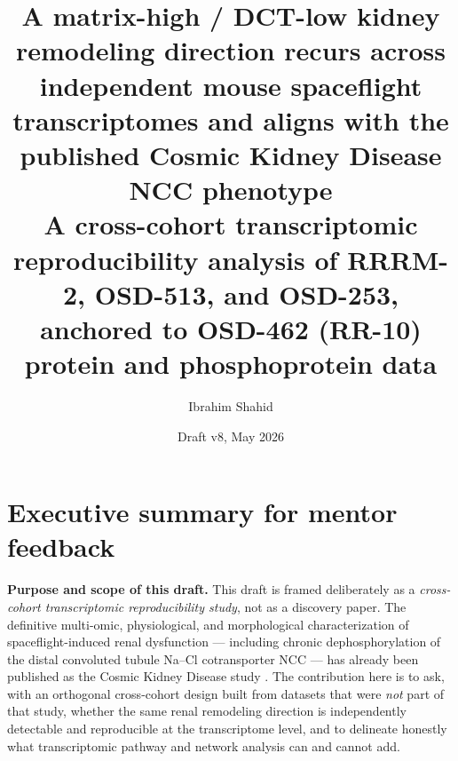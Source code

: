 \documentclass[11pt]{article}
\title{\textbf{A matrix-high / DCT-low kidney remodeling direction recurs across independent mouse spaceflight transcriptomes and aligns with the published Cosmic Kidney Disease NCC phenotype}\\[0.35em]
\large A cross-cohort transcriptomic reproducibility analysis of RRRM-2, OSD-513, and OSD-253, anchored to OSD-462 (RR-10) protein and phosphoprotein data}
\author{Ibrahim Shahid}
\affil{Independent research draft for mentor feedback\\Authorship/collaboration structure pending}
\date{Draft v8, May 2026}
\begin{document}
\maketitle

\section*{Executive summary for mentor feedback}

\noindent\textbf{Purpose and scope of this draft.} This draft is framed deliberately as a \emph{cross-cohort transcriptomic reproducibility study}, not as a discovery paper. The definitive multi-omic, physiological, and morphological characterization of spaceflight-induced renal dysfunction --- including chronic dephosphorylation of the distal convoluted tubule Na--Cl cotransporter NCC --- has already been published as the Cosmic Kidney Disease study \citep{siew2024cosmic}. The contribution here is to ask, with an orthogonal cross-cohort design built from datasets that were \emph{not} part of that study, whether the same renal remodeling direction is independently detectable and reproducible at the transcriptome level, and to delineate honestly what transcriptomic pathway and network analysis can and cannot add.
\end{document}
